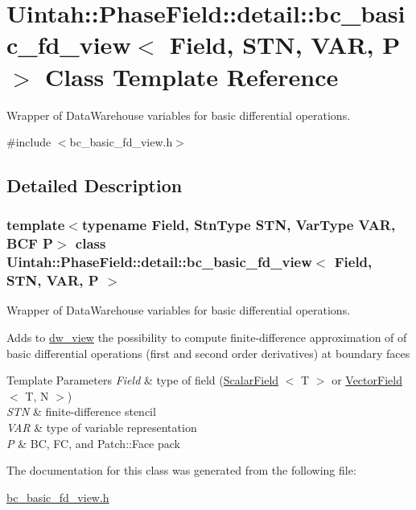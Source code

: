 \hypertarget{classUintah_1_1PhaseField_1_1detail_1_1bc__basic__fd__view}{}\section{Uintah\+:\+:Phase\+Field\+:\+:detail\+:\+:bc\+\_\+basic\+\_\+fd\+\_\+view$<$ Field, S\+TN, V\+AR, P $>$ Class Template Reference}
\label{classUintah_1_1PhaseField_1_1detail_1_1bc__basic__fd__view}


Wrapper of Data\+Warehouse variables for basic differential operations.  




{\ttfamily \#include $<$bc\+\_\+basic\+\_\+fd\+\_\+view.\+h$>$}



\subsection{Detailed Description}
\subsubsection*{template$<$typename Field, Stn\+Type S\+TN, Var\+Type V\+AR, B\+CF P$>$\newline
class Uintah\+::\+Phase\+Field\+::detail\+::bc\+\_\+basic\+\_\+fd\+\_\+view$<$ Field, S\+T\+N, V\+A\+R, P $>$}

Wrapper of Data\+Warehouse variables for basic differential operations. 

Adds to \hyperlink{classUintah_1_1PhaseField_1_1detail_1_1dw__view}{dw\+\_\+view} the possibility to compute finite-\/difference approximation of of basic differential operations (first and second order derivatives) at boundary faces


\begin{DoxyTemplParams}{Template Parameters}
{\em Field} & type of field (\hyperlink{structUintah_1_1PhaseField_1_1ScalarField}{Scalar\+Field} $<$ T $>$ or \hyperlink{structUintah_1_1PhaseField_1_1VectorField}{Vector\+Field} $<$ T, N $>$) \\
\hline
{\em S\+TN} & finite-\/difference stencil \\
\hline
{\em V\+AR} & type of variable representation \\
\hline
{\em P} & BC, FC, and Patch\+::\+Face pack \\
\hline
\end{DoxyTemplParams}


The documentation for this class was generated from the following file\+:\begin{DoxyCompactItemize}
\item 
\hyperlink{bc__basic__fd__view_8h}{bc\+\_\+basic\+\_\+fd\+\_\+view.\+h}\end{DoxyCompactItemize}
